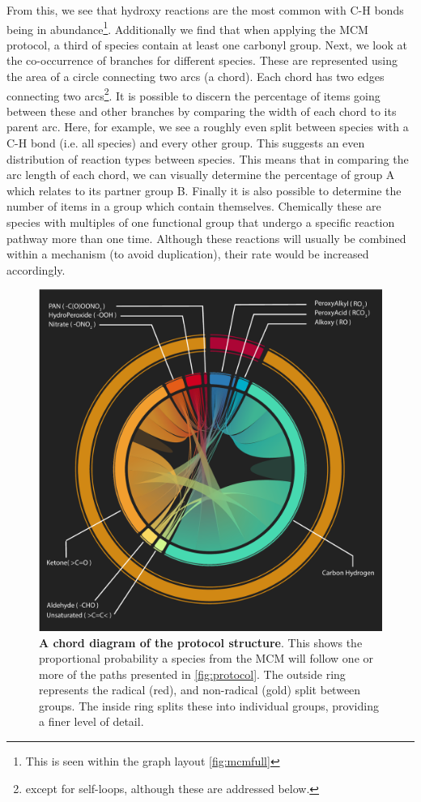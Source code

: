 From this, we see that hydroxy reactions are the most common with C-H bonds being in abundance\footnote{This is seen within the graph layout \autoref{fig:mcmfull}}. Additionally we find that when applying the MCM protocol, a third of species contain at least one carbonyl group. Next, we look at the co-occurrence of branches for different species. These are represented using the area of a circle connecting two arcs (a chord). Each chord has two edges connecting two arcs\footnote{ except for self-loops, although these are addressed below.}.  It is possible to discern the percentage of items going between these and other branches by comparing the width of each chord to its parent arc. Here, for example, we see a roughly even split between species with a C-H bond (i.e. all species) and every other group. This suggests an even distribution of reaction types between species.
This means that in comparing the arc length of each chord, we can visually determine the percentage of group A which relates to its partner group B. Finally it is also possible to determine the number of items in a group which contain themselves. Chemically these are species with multiples of one functional group that undergo a specific reaction pathway more than one time. Although these reactions will usually be combined within a mechanism (to avoid duplication), their rate would be increased accordingly.

\begin{figure}[H]
     \centering
     \includegraphics[width=\textwidth]{figures_c1/radicallayermcmgen.pdf}
        \caption{\textbf{A chord diagram of the protocol structure}. This shows the proportional probability a species from the MCM will follow one or more of the paths presented in \autoref{fig:protocol}. The outside ring represents the radical (red), and non-radical (gold) split between groups. The inside ring splits these into individual groups, providing a finer level of detail. }
        \label{fig:chord}
\end{figure}


